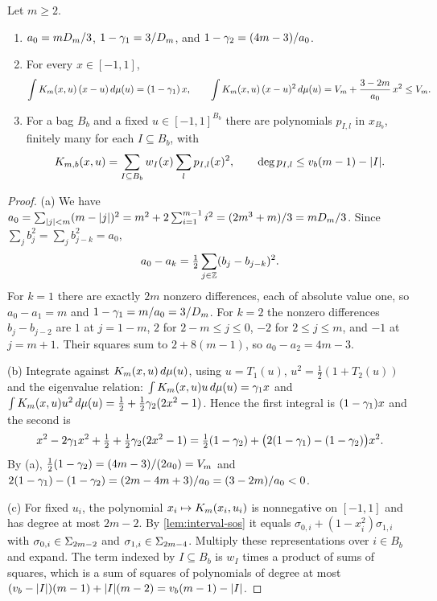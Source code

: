\begin{lemma}\label{lem:rec-kernel}
Let $m\ge2$.
\begin{enumerate}[label=(\alph*)]
\item $a_0=mD_m/3$, $1-\gamma_1=3/D_m$, and
  $1-\gamma_2=(4m-3)/a_0$.
\item For every $x\in[-1,1]$,
  \begin{equation}\label{eq:rec-displacement-identity}
    \int K_m(x,u)\,(x-u)\,d\mu(u)=(1-\gamma_1)\,x,\qquad
    \int K_m(x,u)\,(x-u)^2\,d\mu(u)=V_m+\frac{3-2m}{a_0}\,x^2\le V_m .
  \end{equation}
\item For a bag $B_b$ and a fixed $u\in[-1,1]^{B_b}$ there are polynomials
  $p_{I,l}$ in $x_{B_b}$, finitely many for each $I\subseteq B_b$, with
  \begin{equation}\label{eq:rec-kernel-cert}
    K_{m,b}(x,u)=\sum_{I\subseteq B_b}w_I(x)\sum_lp_{I,l}(x)^2,\qquad
    \deg p_{I,l}\le v_b(m-1)-\lvert I\rvert.
  \end{equation}
\end{enumerate}
\end{lemma}

\begin{proof}
(a) We have $a_0=\sum_{\lvert j\rvert<m}(m-\lvert j\rvert)^2=m^2+2\sum_{i=1}^{m-1}i^2
=(2m^3+m)/3=mD_m/3$. Since $\sum_jb_j^2=\sum_jb_{j-k}^2=a_0$,
\[
  a_0-a_k=\tfrac12\sum_{j\in\mathbb{Z}}(b_j-b_{j-k})^2 .
\]
For $k=1$ there are exactly $2m$ nonzero differences, each of absolute value
one, so $a_0-a_1=m$ and $1-\gamma_1=m/a_0=3/D_m$. For $k=2$ the nonzero
differences $b_j-b_{j-2}$ are $1$ at $j=1-m$, $2$ for $2-m\le j\le0$, $-2$
for $2\le j\le m$, and $-1$ at $j=m+1$. Their squares sum to
$2+8(m-1)$, so $a_0-a_2=4m-3$.

(b) Integrate against $K_m(x,u)\,d\mu(u)$, using $u=T_1(u)$,
$u^2=\tfrac12(1+T_2(u))$ and the eigenvalue relation:
$\int K_m(x,u)u\,d\mu(u)=\gamma_1x$ and
$\int K_m(x,u)u^2\,d\mu(u)=\tfrac12+\tfrac12\gamma_2(2x^2-1)$. Hence the
first integral is $(1-\gamma_1)x$ and the second is
\[
  x^2-2\gamma_1x^2+\tfrac12+\tfrac12\gamma_2(2x^2-1)
  =\tfrac12(1-\gamma_2)+\bigl(2(1-\gamma_1)-(1-\gamma_2)\bigr)x^2 .
\]
By (a), $\tfrac12(1-\gamma_2)=(4m-3)/(2a_0)=V_m$ and
$2(1-\gamma_1)-(1-\gamma_2)=(2m-4m+3)/a_0=(3-2m)/a_0<0$.

(c) For fixed $u_i$, the polynomial $x_i\mapsto K_m(x_i,u_i)$ is nonnegative
on $[-1,1]$ and has degree at most $2m-2$. By \cref{lem:interval-sos} it
equals $\sigma_{0,i}+(1-x_i^2)\sigma_{1,i}$ with $\sigma_{0,i}\in\Sigma_{2m-2}$
and $\sigma_{1,i}\in\Sigma_{2m-4}$. Multiply these representations over
$i\in B_b$ and expand. The term indexed by $I\subseteq B_b$ is $w_I$ times
a product of sums of squares, which is a sum of squares of polynomials of
degree at most $(v_b-\lvert I\rvert)(m-1)+\lvert I\rvert(m-2)=v_b(m-1)-\lvert I\rvert$.
\end{proof}

